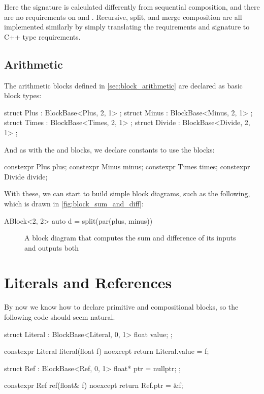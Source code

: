 Here the signature is calculated differently from sequential composition, and there are no requirements on
 and . Recursive, split, and merge composition are all
implemented similarly by simply translating the requirements and signature to C++ type requirements.

\subsection{Arithmetic}

The arithmetic blocks defined in \autoref{sec:block_arithmetic} are declared as basic block types:

\begin{cppcodenl}
  struct Plus : BlockBase<Plus, 2, 1> {};
  struct Minus : BlockBase<Minus, 2, 1> {};
  struct Times : BlockBase<Times, 2, 1> {};
  struct Divide : BlockBase<Divide, 2, 1> {};
\end{cppcodenl}

And as with the \Ident and \Cut blocks, we declare constants to use the blocks:
\begin{cppcodenl}
  constexpr Plus plus;
  constexpr Minus minus;
  constexpr Times times;
  constexpr Divide divide;
\end{cppcodenl}

With these, we can start to build simple block diagrams, such as the following, which is drawn in
\autoref{fig:block_sum_and_diff}:

\begin{cppcodenl}
  ABlock<2, 2> auto d = split(par(plus, minus))
\end{cppcodenl}

\begin{figure}
  \centering
  
  \caption{A block diagram that computes the sum and difference of its inputs and outputs both}
  \label{fig:block_sum_and_diff}
\end{figure}

\section{Literals and References}
\label{sec:eda_lit_and_ref}

By now we know how to declare primitive and compositional blocks, so the following code should seem natural.
\begin{cppcodenl}
  struct Literal : BlockBase<Literal, 0, 1> {
    float value;
  };

  constexpr Literal literal(float f) noexcept {
    return Literal{.value = f};
  }

  struct Ref : BlockBase<Ref, 0, 1> {
    float* ptr = nullptr;
  };

  constexpr Ref ref(float& f) noexcept
  {
    return Ref{.ptr = &f};
  }
\end{cppcodenl}


